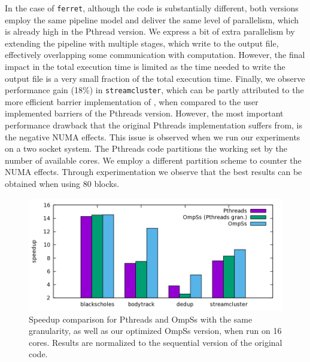 In the case of \texttt{ferret}, although the code is substantially different, both versions employ the same pipeline model and deliver the same level of parallelism, which is already  high in the Pthread version.  
We express 
a bit of extra parallelism by extending the pipeline with multiple stages, which write to the output file, effectively overlapping some communication with computation. 
However, the final impact in the 
total execution time is limited as the time needed to write the output file is a very small fraction of the total execution time. 
Finally, we observe performance gain (18\%) in \texttt{streamcluster}, which can be partly attributed to the more efficient 
barrier implementation of \OMPSS{}, when compared to the user implemented barriers of the Pthreads version. 
However, the most important performance drawback 
that the original Pthreads implementation suffers from, is the negative NUMA effects.
This issue is observed when we run our experiments on a two socket system.
The Pthreads code partitions the working set by the number of available cores.
We employ a different partition scheme to counter the 
NUMA effects. Through experimentation we observe that the best results can be obtained when using 80 blocks. 


\begin{figure}[t]
  \centering
  \includegraphics[width=.9\textwidth]{task_benchmarks/figures/parsec_comparison}
  \caption{Speedup comparison for Pthreads and OmpSs with the same granularity, as well as our optimized OmpSs version, when run on 16 cores. Results are normalized to the sequential version of the original code.}
  \label{fig:granularity_comparison}
	\vspace{0.5cm}
\end{figure}


